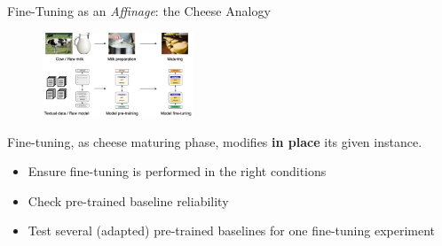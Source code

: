 \documentclass[11pt,aspectratio=169]{beamer}
\begin{document}
\begin{frame}{Fine-Tuning as an \textsl{Affinage}: the Cheese Analogy}
    \begin{figure}
        \centering
        \includegraphics[width=0.4\textwidth]{pretrain_finetune_2.png}
    \end{figure}
    Fine-tuning, as cheese maturing phase, modifies \textbf{in place} its given instance.
    \begin{itemize}
        \item Ensure fine-tuning is performed in the right conditions
        \item Check pre-trained baseline reliability
        \item Test several (adapted) pre-trained baselines for one fine-tuning experiment
    \end{itemize}
\end{frame}
\end{document}
